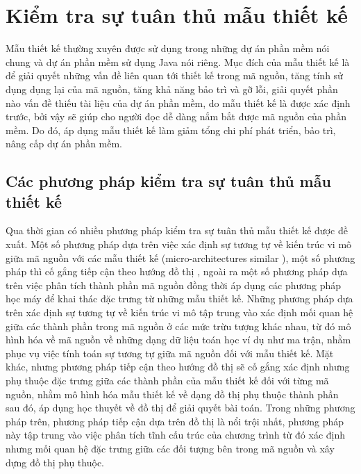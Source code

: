 \documentclass[12pt]{report}
\begin{document}
\section{Kiểm tra sự tuân thủ mẫu thiết kế}
Mẫu thiết kế thường xuyên được sử dụng trong những dự án phần mềm nói chung và dự án phần mềm sử dụng Java nói riêng. Mục đích của mẫu thiết kế là để giải quyết những vấn đề liên quan tới thiết kế trong mã nguồn, tăng tính sử dụng dụng lại của mã nguồn, tăng khả năng bảo trì và gỡ lỗi, giải quyết phần nào vấn đề thiếu tài liệu của dự án phần mềm, do mẫu thiết kế là được xác định trước, bởi vậy sẽ giúp cho người đọc dễ dàng nắm bắt được mã nguồn của phần mềm. Do đó, áp dụng mẫu thiết kế làm giảm tổng chi phí phát triển, bảo trì, nâng cấp dự án phần mềm.
\subsection{Các phương pháp kiểm tra sự tuân thủ mẫu thiết kế}
Qua thời gian có nhiều phương pháp kiểm tra sự tuân thủ mẫu thiết kế được đề xuất. Một số phương pháp dựa trên việc xác định sự tương tự về kiến trúc vi mô giữa mã nguồn với các mẫu thiết kế (micro-architectures similar \cite{micro}), một số phương pháp thì cố gắng tiếp cận theo hướng đồ thị \cite{dong-2008}, ngoài ra một số phương pháp dựa trên việc phân tích thành phần mã nguồn đồng thời áp dụng các phương pháp học máy để khai thác đặc trưng từ những mẫu thiết kế. Những phương pháp dựa trên xác định sự tương tự về kiến trúc vi mô tập trung vào xác định mối quan hệ giữa các thành phần trong mã nguồn ở các mức trừu tượng khác nhau, từ đó mô hình hóa về mã nguồn về những dạng dữ liệu toán học ví dụ như ma trận, nhằm phục vụ việc tính toán sự tương tự giữa mã nguồn đối với mẫu thiết kế.
Mặt khác, nhưng phương pháp tiếp cận theo hướng đồ thị sẽ cố gắng xác định nhưng phụ thuộc đặc trưng giữa các thành phần của mẫu thiết kế đối với từng mã nguồn, nhằm mô hình hóa mẫu thiết kế về dạng đồ thị phụ thuộc thành phần sau đó, áp dụng học thuyết về đồ thị để giải quyết bài toán. Trong những phương pháp trên, phương pháp tiếp cận dựa trên đồ thị là nổi trội nhất, phương pháp này tập trung vào việc phân tích tĩnh cấu trúc của chương trình từ đó xác định nhưng mối quan hệ đặc trưng giữa các đối tượng bên trong mã nguồn và xây dựng đồ thị phụ thuộc.
\end{document}
